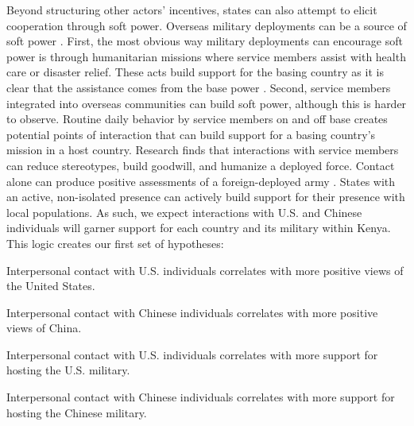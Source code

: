 Beyond structuring other actors' incentives, states can also attempt to elicit cooperation through soft power. Overseas military deployments can be a source of soft power \cite{atkinson2014}. First, the most obvious way military deployments can encourage soft power is through humanitarian missions where service members assist with health care or disaster relief. These acts build support for the basing country as it is clear that the assistance comes from the base power \cite{flynn2019}. Second, service members integrated into overseas communities can build soft power, although this is harder to observe. Routine daily behavior by service members on and off base creates potential points of interaction that can build support for a basing country's mission in a host country. Research finds that interactions with service members can reduce stereotypes, build goodwill, and humanize a deployed force. Contact alone can produce positive assessments of a foreign-deployed army \cite{allen2023}. States with an active, non-isolated presence can actively build support for their presence with local populations. As such, we expect interactions with U.S. and Chinese individuals will garner support for each country and its military within Kenya. This logic creates our first set of hypotheses:

\begin{subhyp}
	
	\begin{hyp}
		Interpersonal contact with U.S. individuals correlates with more positive views of the United States.
	\end{hyp}
	
	\begin{hyp}
		Interpersonal contact with Chinese individuals correlates with more positive views of China.
	\end{hyp}
	
\end{subhyp}

\begin{subhyp}
	
	\begin{hyp}
		Interpersonal contact with U.S. individuals correlates with more support for hosting the U.S. military.
	\end{hyp}
	
	\begin{hyp}
		Interpersonal contact with Chinese individuals correlates with more support for hosting the Chinese military.
	\end{hyp}
	
\end{subhyp}


